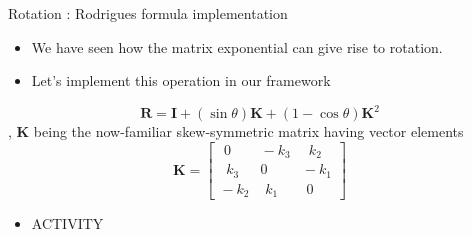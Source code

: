 \documentclass[presentation]{beamer}
\newcommand{\bv}[1]{\ensuremath{\mathbf{#1}}}
\begin{document}
\begin{frame}[label={sec:org5ec76e1}]{Rotation : Rodrigues formula implementation}
\begin{itemize}
\item We have seen how the matrix exponential can give rise to rotation.
\item Let's implement this operation in our framework
\end{itemize}
\[ \mathbf {R} =\mathbf {I} +(\sin \theta )\mathbf {K} +(1-\cos \theta )\mathbf {K} ^{2} \]
, \(\bv{K}\) being the now-familiar skew-symmetric matrix having vector elements
\[ \mathbf {K} = \begin{bmatrix}\,\,0&\!-k_{3}&\,\,\,k_{2}\\\,\,\,k_{3}&0&\!-k_{1}\\\!-k_{2}&\,\,k_{1}&\,\,0\end{bmatrix}
   \]
\begin{itemize}
\item \alert{ACTIVITY}
\end{itemize}
\end{frame}
\end{document}
